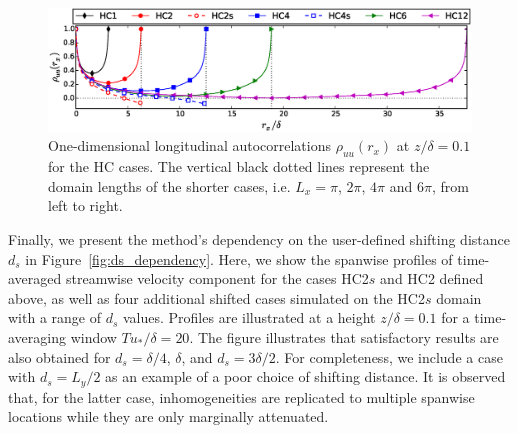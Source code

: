 		\begin{figure}
						\centering
			\includegraphics[width=\textwidth,trim= 0cm 0.2cm 0cm 0.cm,clip]{chapters/turbulent_inflow/spbc/figure9}
			\caption[One-dimensional longitudinal autocorrelations $\rho_{uu}(r_x)$ at $z/\delta = 0.1$ for the HC cases.]{One-dimensional longitudinal autocorrelations $\rho_{uu}(r_x)$ at $z/\delta = 0.1$ for the HC cases. The vertical black dotted lines represent the domain lengths of the shorter cases, i.e. $L_x = \pi$, $2\pi$, $4\pi$ and $6\pi$, from left to right.}
			\label{fig:correlations}
		\end{figure}
		
		Finally, we present the method's dependency on the user-defined shifting distance $d_s$ in Figure~\ref{fig:ds_dependency}. Here, we show the spanwise profiles of time-averaged streamwise velocity component for the cases HC2$s$ and HC2 defined above, as well as four additional shifted cases simulated on the HC2$s$ domain with a range of $d_s$ values. Profiles are illustrated at a height $z/\delta = 0.1$ for a time-averaging window $Tu_*/\delta = 20$. The figure illustrates that satisfactory results are also obtained for $d_s = \delta/4$, $\delta$, and $d_s = 3\delta/2$. For completeness, we include a case with $d_s = L_y/2$ as an example of a poor choice of shifting distance. It is observed that, for the latter case, inhomogeneities are replicated to multiple spanwise locations while they are only marginally attenuated.
		
